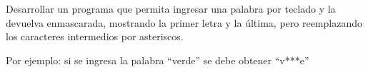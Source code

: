 Desarrollar un programa que permita ingresar una palabra por teclado y la devuelva enmascarada, mostrando la primer letra y la última, pero reemplazando los caracteres intermedios por asteriscos.

Por ejemplo: si se ingresa la palabra ``verde'' se debe obtener ``v***e''

